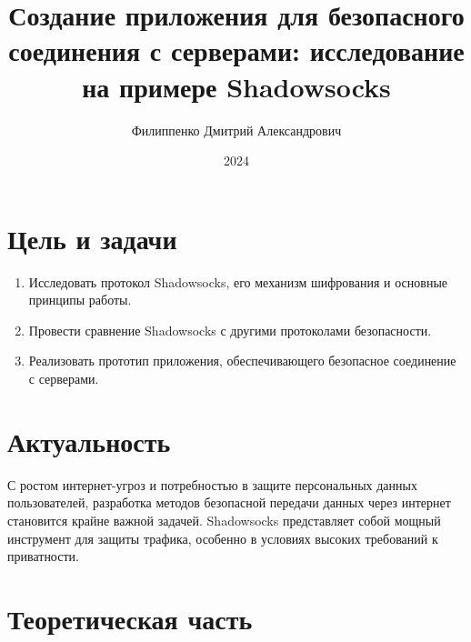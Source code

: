 \documentclass{SCWorks}
\begin{document}

\title{Создание приложения для безопасного соединения с серверами: исследование на примере Shadowsocks}


\author{Филиппенко Дмитрий Александрович}






\date{2024}
\maketitle

\tableofcontents %


\section*{Цель и задачи}

\begin{enumerate}
    \item Исследовать протокол Shadowsocks, его механизм шифрования и основные принципы работы.
    \item Провести сравнение Shadowsocks с другими протоколами безопасности.
    \item Реализовать прототип приложения, обеспечивающего безопасное соединение с серверами.
\end{enumerate}

\section*{Актуальность}

С ростом интернет-угроз и потребностью в защите персональных данных пользователей, разработка методов безопасной передачи данных через интернет становится крайне важной задачей. Shadowsocks представляет собой мощный инструмент для защиты трафика, особенно в условиях высоких требований к приватности.

\newpage

\section{Теоретическая часть}
\end{document}
